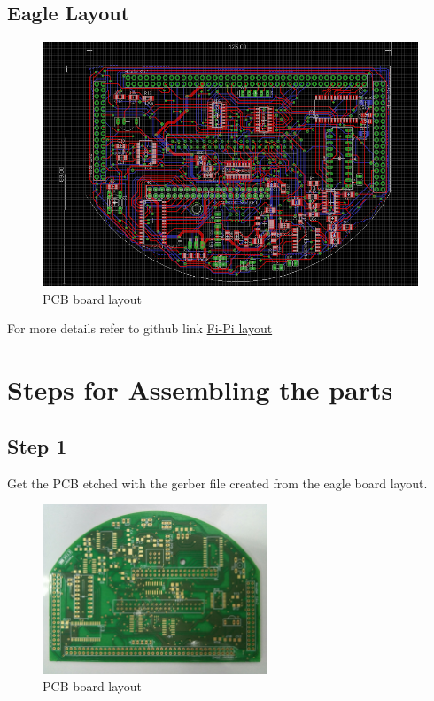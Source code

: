 \documentclass[a4paper,12pt,oneside]{book}
\begin{document}
	\subsection*{Eagle Layout}
\begin{figure}[!ht]
	\includegraphics[width=1.1\textwidth]{layout}
	\caption{PCB board layout }
\end{figure}
For more details refer to github link \href{https://github.com/eYSIP-2017/eYSIP-2017_Fi_Pi/blob/master/Documents/PCB_Schematics/Fi-Pi.brd} {Fi-Pi layout}
\section*{Steps for Assembling the parts}
\subsection*{Step 1}
Get the PCB etched with the gerber file created from the eagle board layout. 
\pagebreak
\begin{figure}[!ht]
	\hspace{3cm}
	\includegraphics[width=0.6\textwidth]{solder_pcb}
	\caption{PCB board layout }
\end{figure}
\end{document}
